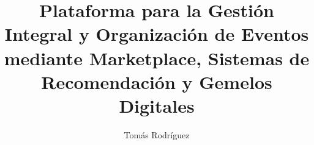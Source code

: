 \documentclass[%
    language=spanish,   %
    guias=true,         %
    pdfa=false,         %
]{usal-proyecto-final}
\title{Plataforma para la Gestión Integral y Organización de Eventos\\
       mediante Marketplace, Sistemas de Recomendación y Gemelos Digitales}
\author{Tomás Rodríguez}
\begin{document}
    \frontmatter

    \mainmatter
    
    \glsresetall %
    
    
    
    
    
    
    

    \backmatter

    \begin{appendices}
        
        
        
    \end{appendices}

    \begin{anexos}
        
    \end{anexos}

    \glosarios
\end{document}
